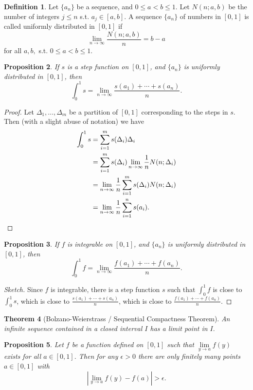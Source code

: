 \documentclass[12pt]{article}
\theoremstyle{plain}
\newtheorem{theorem}{Theorem}
\newtheorem{proposition}[theorem]{Proposition}
\theoremstyle{definition}
\newtheorem{definition}[theorem]{Definition}
\theoremstyle{remark}
\begin{document}
\begin{definition}
Let $\{a_n\}$ be a sequence, and $0 \leq a < b \leq 1$. Let $N(n; a, b)$ be the number of integers $j \leq n$ s.t. $a_j \in [a, b].$ A sequence $\{a_n\}$ of numbers in $[0, 1]$ is called uniformly distributed in $[0, 1]$ if $$\lim_{n \to \infty} \frac{N(n; a, b)}{n} = b - a$$ for all $a, b,$ s.t. $0 \leq a < b \leq 1.$
\end{definition}

\begin{proposition}
If $s$ is a step function on $[0, 1]$, and $\{a_n\}$ is uniformly distributed in $[0, 1]$, then $$\int_0^1 s = \lim_{n\to\infty} \frac{s(a_1) + \cdots + s(a_n)}{n}.$$
\end{proposition}

\begin{proof}
Let $\Delta_1, \ldots, \Delta_m$ be a partition of $[0, 1]$ corresponding to the steps in $s.$ Then (with a slight abuse of notation) we have 
\begin{align*}
\int_0^1 s &= \sum_{i=1}^m s(\Delta_i) \Delta_i \\
&= \sum_{i=1}^m s(\Delta_i) \lim_{n \to \infty} \frac{1}{n} N(n; \Delta_i) \\
&= \lim_{n \to \infty} \frac{1}{n} \sum_{i=1}^m s(\Delta_i) N(n; \Delta_i) \\
&= \lim_{n \to \infty} \frac{1}{n} \sum_{i=1}^n s(a_i).\qedhere
\end{align*}
\end{proof}

\begin{proposition}
If $f$ is integrable on $[0, 1]$, and $\{a_n\}$ is uniformly distributed in $[0, 1]$, then $$\int_0^1 f = \lim_{n\to\infty} \frac{f(a_1) + \cdots + f(a_n)}{n}.$$
\end{proposition}

\begin{proof}[Sketch]
Since $f$ is integrable, there is a step function $s$ such that $\int_0^1 f$ is close to $\int_0^1 s$, which is close to $\frac{s(a_1) + \cdots + s(a_n)}{n}$, which is close to $\frac{f(a_1) + \cdots + f(a_n)}{n}$.
\end{proof}

\begin{theorem}[Bolzano-Weierstrass / Sequential Compactness Theorem]
An infinite sequence contained in a closed interval $I$ has a limit point in $I.$
\end{theorem}

\begin{proposition}
Let $f$ be a function defined on $[0, 1]$ such that $\lim\limits_{y\to a} f(y)$ exists for all $a \in [0, 1]$. Then for any $\epsilon > 0$ there are only finitely many points $a \in [0, 1]$ with $$|\lim\limits_{y\to a} f(y) - f(a)| > \epsilon.$$
\end{proposition}
\end{document}
